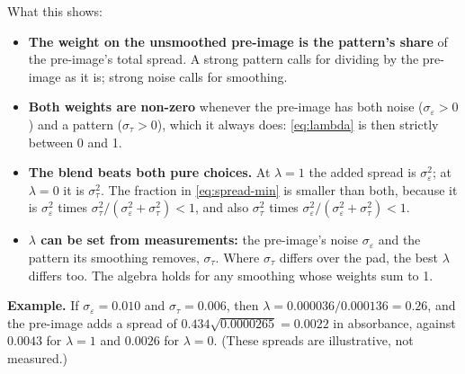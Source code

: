\documentclass[11pt,letter]{article}
\begin{document}
\noindent What this shows:
\begin{itemize}
  \item \textbf{The weight on the unsmoothed pre-image is the pattern's
    share} of the pre-image's total spread.  A strong pattern calls for
    dividing by the pre-image as it is; strong noise calls for smoothing.
  \item \textbf{Both weights are non-zero} whenever the pre-image has both
    noise ($\sigma_\varepsilon > 0$) and a pattern ($\sigma_\tau > 0$),
    which it always does: \eqref{eq:lambda} is then strictly between 0
    and 1.
  \item \textbf{The blend beats both pure choices.}  At $\lambda = 1$ the
    added spread is $\sigma_\varepsilon^2$; at $\lambda = 0$ it is
    $\sigma_\tau^2$.  The fraction in \eqref{eq:spread-min} is smaller
    than both, because it is $\sigma_\varepsilon^2$ times
    $\sigma_\tau^2/(\sigma_\varepsilon^2 + \sigma_\tau^2) < 1$, and also
    $\sigma_\tau^2$ times
    $\sigma_\varepsilon^2/(\sigma_\varepsilon^2 + \sigma_\tau^2) < 1$.
  \item \textbf{$\lambda$ can be set from measurements:} the pre-image's
    noise $\sigma_\varepsilon$ and the pattern its smoothing removes,
    $\sigma_\tau$.  Where $\sigma_\tau$ differs over the pad, the best
    $\lambda$ differs too.  The algebra holds for any smoothing whose
    weights sum to 1.
\end{itemize}

\noindent\textbf{Example.}  If $\sigma_\varepsilon = 0.010$ and
$\sigma_\tau = 0.006$, then $\lambda = 0.000036/0.000136 = 0.26$, and the
pre-image adds a spread of $0.434\sqrt{0.0000265} = 0.0022$ in absorbance,
against $0.0043$ for $\lambda = 1$ and $0.0026$ for $\lambda = 0$.  (These
spreads are illustrative, not measured.)
\end{document}
